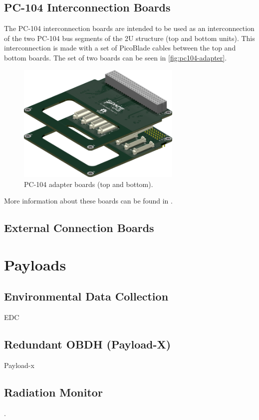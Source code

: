 \subsection{PC-104 Interconnection Boards}

The PC-104 interconnection boards are intended to be used as an interconnection of the two PC-104 bus segments of the 2U structure (top and bottom units). This interconnection is made with a set of PicoBlade cables between the top and bottom boards. The set of two boards can be seen in \autoref{fig:pc104-adapter}.

\begin{figure}[!ht]
    \begin{center}
        \includegraphics[width=0.7\textwidth]{figures/pc104-adapter}
        \caption{PC-104 adapter boards (top and bottom).}
        \label{fig:pc104-adapter}
    \end{center}
\end{figure}

More information about these boards can be found in \cite{pc104-boards}.

\subsection{External Connection Boards}

\cite{iip}

\section{Payloads}

\subsection{Environmental Data Collection}

EDC \cite{edc}

\subsection{Redundant OBDH (Payload-X)}

Payload-x \cite{payload-x}

\subsection{Radiation Monitor}

.
